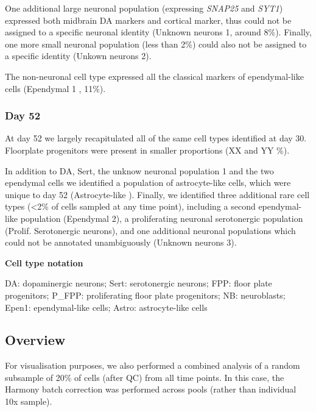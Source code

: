 One additional large neuronal population (expressing \textit{SNAP25} and \textit{SYT1}) expressed both midbrain DA markers and cortical marker, thus could not be assigned to a specific neuronal identity (Unknown neurons 1, around 8\%).
Finally, one more small neuronal population (less than 2\%) could also not be assigned to a specific identity (Unkown neurons 2). 

The non-neuronal cell type expressed all the classical markers of ependymal-like cells (Ependymal 1 \cite{campbell2017molecular}, 11\%). 

\subsubsection{Day 52}

At day 52 we largely recapitulated all of the same cell types identified at day 30.
Floorplate progenitors were present in smaller proportions (XX and YY \%).

In addition to DA, Sert, the unknow neuronal population 1 and the two ependymal cells we identified a population of astrocyte-like cells, which were unique to day 52 (Astrocyte-like \cite{sloan2017human, zhang2016purification}). 
Finally, we identified three additional rare cell types (<2\% of cells sampled at any time point), including a second ependymal-like population (Ependymal 2), a proliferating neuronal serotonergic population (Prolif. Serotonergic neurons), and one additional neuronal populations which could not be annotated unambiguously (Unknown neurons 3).

\begin{Abstract}
\textbf{Cell type notation}

DA: dopaminergic neurons;
Sert: serotonergic neurons;
FPP: floor plate progenitors;
P\_FPP: proliferating floor plate progenitors;
NB: neuroblasts;
Epen1: ependymal-like cells;
Astro: astrocyte-like cells
\end{Abstract}

\subsection{Overview}

For visualisation purposes, we also performed a combined analysis of a random subsample of 20\% of cells (after QC) from all time points.
In this case, the Harmony batch correction was performed across pools (rather than individual 10x sample).

